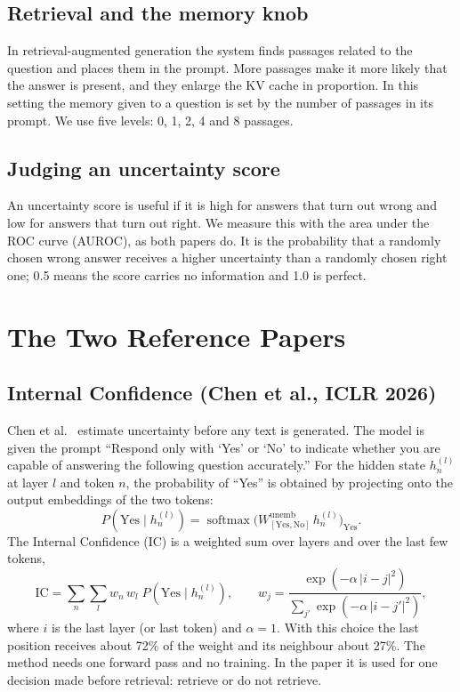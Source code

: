 \documentclass[11pt,a4paper]{article}
\begin{document}
\subsection{Retrieval and the memory knob}

In retrieval-augmented generation the system finds passages related to the
question and places them in the prompt. More passages make it more likely that
the answer is present, and they enlarge the KV cache in proportion. In this
setting the memory given to a question is set by the number of passages in its
prompt. We use five levels: 0, 1, 2, 4 and 8 passages.

\subsection{Judging an uncertainty score}

An uncertainty score is useful if it is high for answers that turn out wrong
and low for answers that turn out right. We measure this with the area under
the ROC curve (AUROC), as both papers do. It is the probability that a randomly
chosen wrong answer receives a higher uncertainty than a randomly chosen right
one; 0.5 means the score carries no information and 1.0 is perfect.

\section{The Two Reference Papers}

\subsection{Internal Confidence (Chen et al., ICLR 2026)}

Chen et al.~\cite{chen2026query} estimate uncertainty before any text is
generated. The model is given the prompt ``Respond only with `Yes' or `No' to
indicate whether you are capable of answering the following question
accurately.'' For the hidden state $h_n^{(l)}$ at layer $l$ and token $n$, the
probability of ``Yes'' is obtained by projecting onto the output embeddings of
the two tokens:
\begin{equation}
P(\text{Yes}\mid h_n^{(l)}) = \operatorname{softmax}\bigl(W^{\text{unemb}}_{[\text{Yes},\text{No}]}\, h_n^{(l)}\bigr)_{\text{Yes}} .
\end{equation}
The Internal Confidence (IC) is a weighted sum over layers and over the last
few tokens,
\begin{equation}
\mathrm{IC} = \sum_{n}\sum_{l} w_n\, w_l\; P(\text{Yes}\mid h_n^{(l)}),
\qquad
w_j = \frac{\exp(-\alpha\,|i-j|^2)}{\sum_{j'}\exp(-\alpha\,|i-j'|^2)},
\end{equation}
where $i$ is the last layer (or last token) and $\alpha = 1$. With this choice
the last position receives about 72\% of the weight and its neighbour about
27\%. The method needs one forward pass and no training. In the paper it is
used for one decision made before retrieval: retrieve or do not retrieve.
\end{document}
